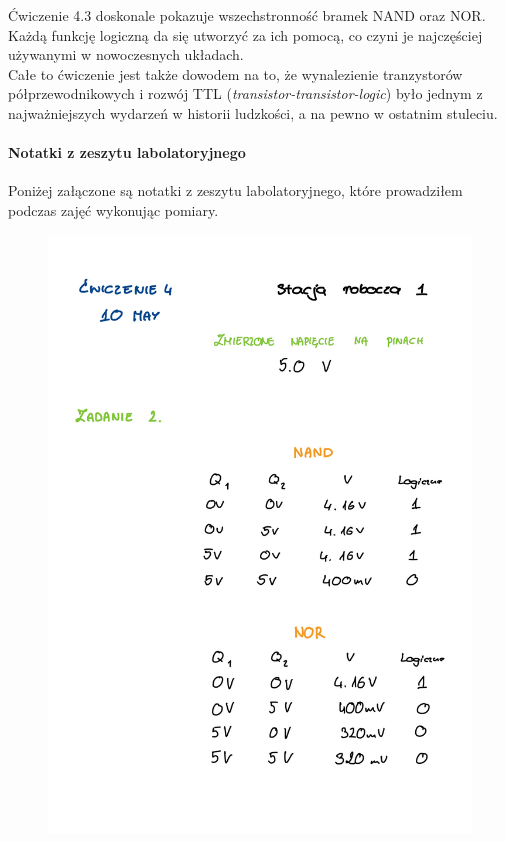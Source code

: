 \documentclass[14pt, table]{extarticle}
\begin{document}
Ćwiczenie 4.3 doskonale pokazuje wszechstronność bramek NAND oraz NOR. Każdą funkcję logiczną da się utworzyć za ich pomocą, co czyni je najczęściej używanymi w nowoczesnych układach. \\

Całe to ćwiczenie jest także dowodem na to, że wynalezienie tranzystorów półprzewodnikowych i rozwój TTL (\textit{transistor-transistor-logic}) było jednym z najważniejszych wydarzeń w historii ludzkości, a na pewno w ostatnim stuleciu.



\newpage
\paragraph{Notatki z zeszytu labolatoryjnego \\}
Poniżej załączone są notatki z zeszytu labolatoryjnego, które prowadziłem podczas zajęć wykonując pomiary.

\begin{figure}[H]
\includegraphics[scale=0.2]{B0}
\centering
\captionsetup{labelformat=empty}
\caption{}
\end{figure}
\end{document}
